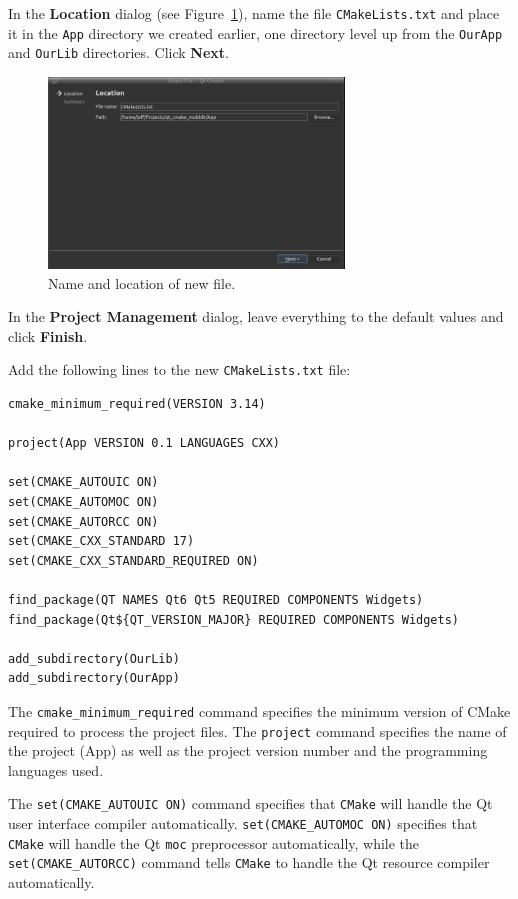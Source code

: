 \documentclass[letterpaper]{article}
\begin{document}
  In the \textbf{Location} dialog (see Figure~\ref{fig:new_file_location}),
  name the file \verb|CMakeLists.txt| and place it
  in the \verb|App| directory we created earlier, one directory level up from the
  \verb|OurApp| and \verb|OurLib| directories. Click \textbf{Next}.
  \begin{figure}[H]
    \centering
    \includegraphics[width=0.7\textwidth]{new_file_location.png}
    \caption{Name and location of new file.}
    \label{fig:new_file_location}
  \end{figure}

  In the \textbf{Project Management} dialog, leave everything to the default values
  and click \textbf{Finish}.

  Add the following lines to the new \verb|CMakeLists.txt| file:
  \begin{lstlisting}
cmake_minimum_required(VERSION 3.14)

project(App VERSION 0.1 LANGUAGES CXX)

set(CMAKE_AUTOUIC ON)
set(CMAKE_AUTOMOC ON)
set(CMAKE_AUTORCC ON)
set(CMAKE_CXX_STANDARD 17)
set(CMAKE_CXX_STANDARD_REQUIRED ON)

find_package(QT NAMES Qt6 Qt5 REQUIRED COMPONENTS Widgets)
find_package(Qt${QT_VERSION_MAJOR} REQUIRED COMPONENTS Widgets)

add_subdirectory(OurLib)
add_subdirectory(OurApp)
  \end{lstlisting}

  The \verb|cmake_minimum_required| command specifies the minimum
  version of CMake required to process the project files.
  The \verb|project| command specifies the name of the project (App)
  as well as the project version number and the programming languages used.

  The \verb|set(CMAKE_AUTOUIC ON)| command specifies that \verb|CMake| will
  handle the Qt user interface compiler automatically. \verb|set(CMAKE_AUTOMOC ON)|
  specifies that \verb|CMake| will handle the Qt \verb|moc| preprocessor
  automatically, while the \verb|set(CMAKE_AUTORCC)| command tells \verb|CMake|
  to handle the Qt resource compiler automatically.
\end{document}
